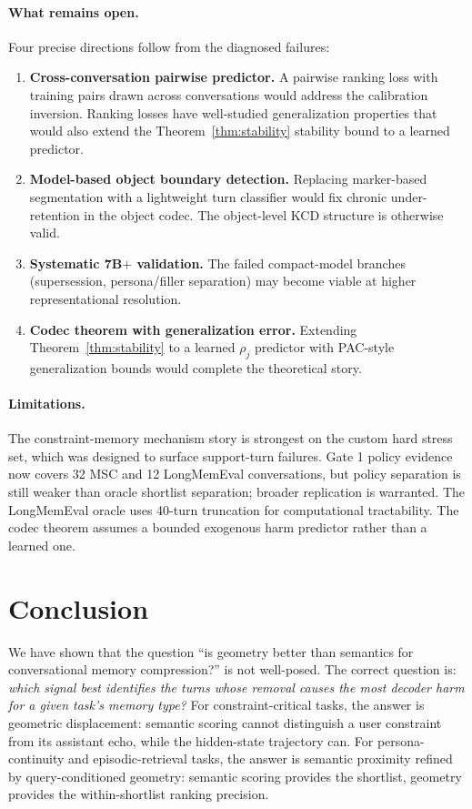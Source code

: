 \documentclass[conference]{IEEEtran}
\begin{document}
\paragraph{What remains open.}
Four precise directions follow from the diagnosed failures:
\begin{enumerate}[leftmargin=1.4em]
\item \textbf{Cross-conversation pairwise predictor.} A pairwise ranking loss
  with training pairs drawn across conversations would address the calibration
  inversion. Ranking losses have well-studied generalization properties that
  would also extend the Theorem~\ref{thm:stability} stability bound to a
  learned predictor.
\item \textbf{Model-based object boundary detection.} Replacing marker-based
  segmentation with a lightweight turn classifier would fix chronic
  under-retention in the object codec. The object-level KCD structure is
  otherwise valid.
\item \textbf{Systematic 7B$+$ validation.} The failed compact-model branches
  (supersession, persona/filler separation) may become viable at higher
  representational resolution.
\item \textbf{Codec theorem with generalization error.} Extending
  Theorem~\ref{thm:stability} to a learned $\rho_j$ predictor with PAC-style
  generalization bounds would complete the theoretical story.
\end{enumerate}

\paragraph{Limitations.}
The constraint-memory mechanism story is strongest on the custom hard stress
set, which was designed to surface support-turn failures. Gate 1 policy
evidence now covers 32 MSC and 12 LongMemEval conversations, but policy
separation is still weaker than oracle shortlist separation; broader
replication is warranted. The LongMemEval oracle uses 40-turn truncation for
computational tractability. The codec theorem assumes a bounded exogenous harm
predictor rather than a learned one.

\section{Conclusion}
\label{sec:conclusion}

We have shown that the question ``is geometry better than semantics for
conversational memory compression?'' is not well-posed. The correct question
is: \emph{which signal best identifies the turns whose removal causes the most
decoder harm for a given task's memory type?} For constraint-critical tasks, the
answer is geometric displacement: semantic scoring cannot distinguish a user
constraint from its assistant echo, while the hidden-state trajectory can. For
persona-continuity and episodic-retrieval tasks, the answer is semantic
proximity refined by query-conditioned geometry: semantic scoring provides the
shortlist, geometry provides the within-shortlist ranking precision.
\end{document}
